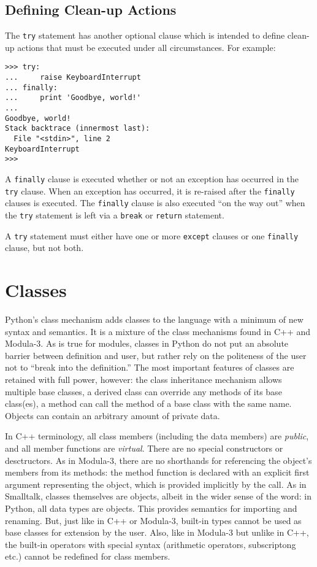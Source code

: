 \section{Defining Clean-up Actions}

The {\tt try} statement has another optional clause which is intended to
define clean-up actions that must be executed under all circumstances.
For example:

\bcode\begin{verbatim}
>>> try:
...     raise KeyboardInterrupt
... finally:
...     print 'Goodbye, world!'
... 
Goodbye, world!
Stack backtrace (innermost last):
  File "<stdin>", line 2
KeyboardInterrupt
>>> 
\end{verbatim}\ecode
%
A {\tt finally} clause is executed whether or not an exception has
occurred in the {\tt try} clause.  When an exception has occurred, it
is re-raised after the {\tt finally} clauses is executed.  The
{\tt finally} clause is also executed ``on the way out'' when the
{\tt try} statement is left via a {\tt break} or {\tt return}
statement.

A {\tt try} statement must either have one or more {\tt except}
clauses or one {\tt finally} clause, but not both.


\chapter{Classes}

Python's class mechanism adds classes to the language with a minimum
of new syntax and semantics.  It is a mixture of the class mechanisms
found in C++ and Modula-3.  As is true for modules, classes in Python
do not put an absolute barrier between definition and user, but rather
rely on the politeness of the user not to ``break into the
definition.''  The most important features of classes are retained
with full power, however: the class inheritance mechanism allows
multiple base classes, a derived class can override any methods of its
base class(es), a method can call the method of a base class with the
same name.  Objects can contain an arbitrary amount of private data.

In C++ terminology, all class members (including the data members) are
{\em public}, and all member functions are {\em virtual}.  There are
no special constructors or desctructors.  As in Modula-3, there are no
shorthands for referencing the object's members from its methods: the
method function is declared with an explicit first argument
representing the object, which is provided implicitly by the call.  As
in Smalltalk, classes themselves are objects, albeit in the wider
sense of the word: in Python, all data types are objects.  This
provides semantics for importing and renaming.  But, just like in C++
or Modula-3, built-in types cannot be used as base classes for
extension by the user.  Also, like in Modula-3 but unlike in C++, the
built-in operators with special syntax (arithmetic operators,
subscriptong etc.) cannot be redefined for class members.


